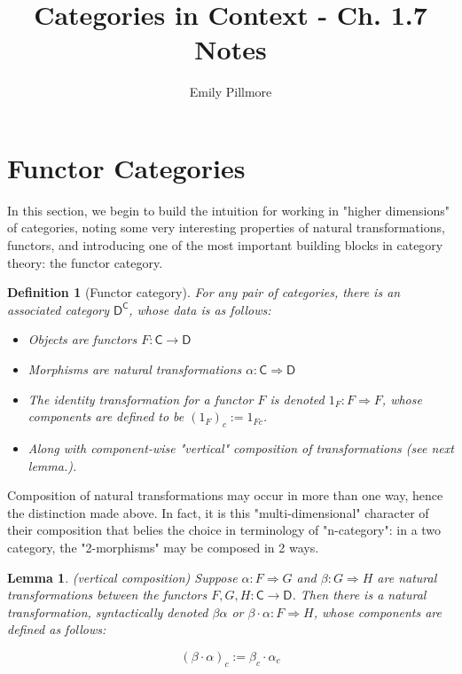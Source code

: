 \documentclass[10pt, oneside]{article}   	%
\title{Categories in Context - Ch. 1.7 Notes}
\author{Emily Pillmore}
\newcommand{\cat}[1]{\mathsf{#1}}
\newcommand{\cc}{\cat{C}}
\newcommand{\dd}{\cat{D}}
\newcommand{\nt}{\Rightarrow}
\newtheorem{lemma}[theorem]{Lemma}
\newtheorem{definition}[theorem]{Definition}
\begin{document}
\maketitle

\section{Functor Categories}

In this section, we begin to build the intuition for working in "higher dimensions" of categories, noting some very interesting properties of natural transformations, functors, and introducing one of the most important building blocks in category theory: the functor category. 

\begin{definition}[Functor category]

For any pair of categories, there is an associated category $\dd^{\cc}$, whose data is as follows: 

\begin{itemize}
	\item Objects are functors $F : \cc \to \dd$
	\item Morphisms are natural transformations $\alpha : \cc \nt \dd$
	\item The identity transformation for a functor $F$ is denoted $1_F : F \nt F$, whose components are defined to be $(1_F)_c := 1_{Fc}$. 
	\item Along with component-wise "vertical" composition of transformations (see next lemma.).
\end{itemize}
\end{definition}

Composition of natural transformations may occur in more than one way, hence the distinction made above. In fact, it is this "multi-dimensional" character of their composition that belies the choice in terminology of "n-category": in a two category, the "2-morphisms" may be composed in 2 ways. 

\begin{lemma}(vertical composition)
	Suppose $\alpha : F \nt G$ and $\beta : G \nt H$ are natural transformations between the functors $F,G,H : \cc \to \dd$. Then there is a natural transformation, syntactically denoted $\beta \alpha$ or $\beta \cdot \alpha : F \nt H$, whose components are defined as follows: 
	
\begin{center}
	\begin{equation}
		(\beta \cdot \alpha)_c := \beta_c \cdot \alpha_c
	\end{equation}
\end{center}
\end{lemma}
\end{document}
